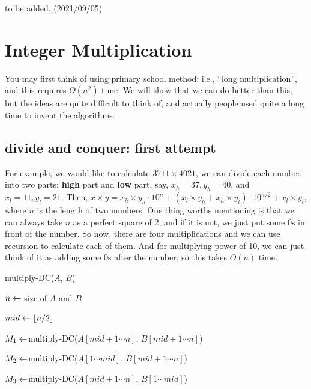 \documentclass[11pt, a4paper]{COMP3711}
\begin{document}
\begin{spacing}{1.5}
    {\Large\color{red} to be added. (2021/09/05)}

    \section{Integer Multiplication}

    You may first think of using primary school method: 
    i.e., ``long multiplication'', and this requires $\Theta(n^2)$
    time. We will show that we can do better than this, but 
    the ideas are quite difficult to think of, and actually 
    people used quite a long time to invent the algorithms.

    \subsection{divide and conquer: first attempt}

    For example, we would like to calculate $3711\times 4021$,
    we can divide each number into two parts: {\bf high} part 
    and {\bf low} part, say, $x_h=37, y_h=40$, and $x_l=11, y_l=21$.
    Then, $x\times y=x_h\times y_h\cdot 10^n+(x_l\times y_h+x_h\times 
    y_l)\cdot 10^{n/2}+x_l\times y_l$, where $n$ is the length of 
    two numbers. One thing worths mentioning is that we can always 
    take $n$ as a perfect square of 2, and if it is not, we just 
    put some 0s in front of the number.
    So now, there are four multiplications and we can use recursion 
    to calculate each of them. And for multiplying power of 10, 
    we can just think of it as adding some 0s after the number, so 
    this takes $O(n)$ time.

    \begin{algorithm}
        \caption{multiply-DC($A$, $B$)}

        $n\leftarrow $ size of $A$ and $B$


        $mid\leftarrow \lfloor n/2 \rfloor$

        $M_1\leftarrow $multiply-DC($A[mid+1\cdots n]$, $B[mid+1\cdots n]$)
        \qquad {}

        $M_2\leftarrow $multiply-DC($A[1\cdots mid]$, $B[mid+1\cdots n]$)
        \qquad {}

        $M_3\leftarrow $multiply-DC($A[mid+1\cdots n]$, $B[1\cdots mid]$)
        \qquad {}


\end{algorithm}
\end{spacing}
\end{document}
